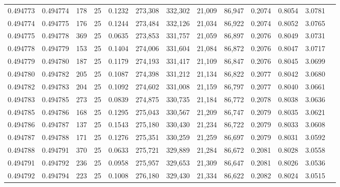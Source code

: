 \begin{tabular}{rrrrrrrrrrrrr}
0.494773 & 0.494774 &   178 &  25 &                                     0.1232 & 273,308 & 332,302 &  21,009 &  86,947 & 0.2074 & 0.8054 & 3.0781 \\
0.494774 & 0.494775 &   176 &  25 &                                     0.1244 & 273,484 & 332,126 &  21,034 &  86,922 & 0.2074 & 0.8052 & 3.0765 \\
0.494775 & 0.494778 &   369 &  25 &                                     0.0635 & 273,853 & 331,757 &  21,059 &  86,897 & 0.2076 & 0.8049 & 3.0731 \\
0.494778 & 0.494779 &   153 &  25 &                                     0.1404 & 274,006 & 331,604 &  21,084 &  86,872 & 0.2076 & 0.8047 & 3.0717 \\
0.494779 & 0.494780 &   187 &  25 &                                     0.1179 & 274,193 & 331,417 &  21,109 &  86,847 & 0.2076 & 0.8045 & 3.0699 \\
0.494780 & 0.494782 &   205 &  25 &                                     0.1087 & 274,398 & 331,212 &  21,134 &  86,822 & 0.2077 & 0.8042 & 3.0680 \\
0.494782 & 0.494783 &   204 &  25 &                                     0.1092 & 274,602 & 331,008 &  21,159 &  86,797 & 0.2077 & 0.8040 & 3.0661 \\
0.494783 & 0.494785 &   273 &  25 &                                     0.0839 & 274,875 & 330,735 &  21,184 &  86,772 & 0.2078 & 0.8038 & 3.0636 \\
0.494785 & 0.494786 &   168 &  25 &                                     0.1295 & 275,043 & 330,567 &  21,209 &  86,747 & 0.2079 & 0.8035 & 3.0621 \\
0.494786 & 0.494787 &   137 &  25 &                                     0.1543 & 275,180 & 330,430 &  21,234 &  86,722 & 0.2079 & 0.8033 & 3.0608 \\
0.494787 & 0.494788 &   171 &  25 &                                     0.1276 & 275,351 & 330,259 &  21,259 &  86,697 & 0.2079 & 0.8031 & 3.0592 \\
0.494788 & 0.494791 &   370 &  25 &                                     0.0633 & 275,721 & 329,889 &  21,284 &  86,672 & 0.2081 & 0.8028 & 3.0558 \\
0.494791 & 0.494792 &   236 &  25 &                                     0.0958 & 275,957 & 329,653 &  21,309 &  86,647 & 0.2081 & 0.8026 & 3.0536 \\
0.494792 & 0.494794 &   223 &  25 &                                     0.1008 & 276,180 & 329,430 &  21,334 &  86,622 & 0.2082 & 0.8024 & 3.0515 \\

\end{tabular}
